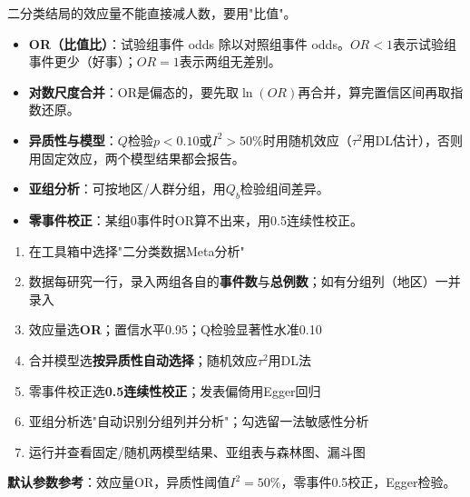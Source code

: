 \begin{algoprinciple}
二分类结局的效应量不能直接减人数，要用"比值"。

\begin{itemize}
    \item \textbf{OR（比值比）}：试验组事件 odds 除以对照组事件 odds。$OR<1$表示试验组事件更少（好事）；$OR=1$表示两组无差别。
    \item \textbf{对数尺度合并}：OR是偏态的，要先取$\ln(OR)$再合并，算完置信区间再取指数还原。
    \item \textbf{异质性与模型}：$Q$检验$p<0.10$或$I^2>50\%$时用随机效应（$\tau^2$用DL估计），否则用固定效应，两个模型结果都会报告。
    \item \textbf{亚组分析}：可按地区/人群分组，用$Q_b$检验组间差异。
    \item \textbf{零事件校正}：某组0事件时OR算不出来，用0.5连续性校正。
\end{itemize}
\end{algoprinciple}

\begin{algosposs}
\begin{enumerate}
    \item 在工具箱中选择"二分类数据Meta分析"
    \item 数据每研究一行，录入两组各自的\textbf{事件数}与\textbf{总例数}；如有分组列（地区）一并录入
    \item 效应量选\textbf{OR}；置信水平0.95；Q检验显著性水准0.10
    \item 合并模型选\textbf{按异质性自动选择}；随机效应$\tau^2$用DL法
    \item 零事件校正选\textbf{0.5连续性校正}；发表偏倚用Egger回归
    \item 亚组分析选"自动识别分组列并分析"；勾选留一法敏感性分析
    \item 运行并查看固定/随机两模型结果、亚组表与森林图、漏斗图
\end{enumerate}

\textbf{默认参数参考}：效应量OR，异质性阈值$I^2=50\%$，零事件0.5校正，Egger检验。
\end{algosposs}

